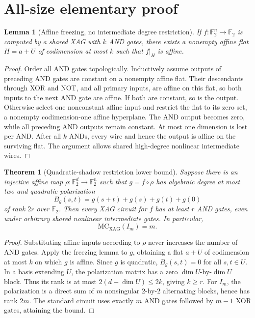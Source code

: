 \documentclass[11pt]{article}
\newtheorem{theorem}{Theorem}
\newtheorem{lemma}{Lemma}
\begin{document}
\section*{All-size elementary proof}
\begin{lemma}[Affine freezing, no intermediate degree restriction]
If $f:\mathbb F_2^n\to\mathbb F_2$ is computed by a shared XAG with $k$ AND gates, there exists a nonempty affine flat $H=a+U$ of codimension at most $k$ such that $f|_H$ is affine.
\end{lemma}
\begin{proof}
Order all AND gates topologically. Inductively assume outputs of preceding AND gates are constant on a nonempty affine flat. Their descendants through XOR and NOT, and all primary inputs, are affine on this flat, so both inputs to the next AND gate are affine. If both are constant, so is the output. Otherwise select one nonconstant affine input and restrict the flat to its zero set, a nonempty codimension-one affine hyperplane. The AND output becomes zero, while all preceding AND outputs remain constant. At most one dimension is lost per AND. After all $k$ ANDs, every wire and hence the output is affine on the surviving flat. The argument allows shared high-degree nonlinear intermediate wires.
\end{proof}
\begin{theorem}[Quadratic-shadow restriction lower bound]
Suppose there is an injective affine map $\rho:\mathbb F_2^d\to\mathbb F_2^n$ such that $g=f\circ\rho$ has algebraic degree at most two and quadratic polarization
$$B_g(s,t)=g(s+t)+g(s)+g(t)+g(0)$$
of rank $2r$ over $\mathbb F_2$. Then every XAG circuit for $f$ has at least $r$ AND gates, even under arbitrary shared nonlinear intermediate gates. In particular,
$$\boxed{\mathrm{MC}_{\mathrm{XAG}}(I_m)=m}.$$
\end{theorem}
\begin{proof}
Substituting affine inputs according to $\rho$ never increases the number of AND gates. Apply the freezing lemma to $g$, obtaining a flat $a+U$ of codimension at most $k$ on which $g$ is affine. Since $g$ is quadratic, $B_g(s,t)=0$ for all $s,t\in U$. In a basis extending $U$, the polarization matrix has a zero $\dim U$-by-$\dim U$ block. Thus its rank is at most $2(d-\dim U)\le2k$, giving $k\ge r$. For $I_m$, the polarization is a direct sum of $m$ nonsingular $2$-by-$2$ alternating blocks, hence has rank $2m$. The standard circuit uses exactly $m$ AND gates followed by $m-1$ XOR gates, attaining the bound.
\end{proof}
\end{document}
